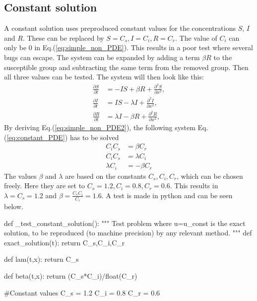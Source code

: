 \documentclass[%
twoside,                 %
final,                   %
chapterprefix=true,      %
open=right               %
10pt]{book}
\begin{document}
\subsection{Constant solution}
A constant solution uses preproduced constant values for the concentrations $S$, $I$ and $R$. These can be replaced by $S = C_s,I=C_i,R=C_r$. The value of $C_i$ can only be 0 in Eq.(\ref{eq:simple_non_PDE}). This results in a poor test where several bugs can escape. The system can be expanded by adding a term $\beta R$ to the susceptible group and subtracting the same term from the removed group. Then all three values can be tested. The system will then look like this: 
\begin{equation} \label{eq:simple_non_PDE2}
	\begin{aligned}
	\frac{\partial S}{\partial t} &= -IS + \beta R + \frac{\partial^2 S}{\partial x^2},\\
	\frac{\partial I}{\partial t} &= IS- \lambda I + \frac{\partial^2 I}{\partial x^2},\\
	\frac{\partial R}{\partial t} &= \lambda I - \beta R + \frac{\partial^2 R}{\partial x^2},
	\end{aligned}
\end{equation}
By deriving Eq.(\ref{eq:simple_non_PDE2}), the following system Eq.(\ref{eq:constant_PDE}) has to be solved
\begin{equation} \label{eq:constant_PDE}
	\begin{aligned}
	C_iC_s &= \beta C_r \\
	C_iC_s &= \lambda C_i \\
	\lambda C_i &= -\beta C_r 
	\end{aligned}
\end{equation}
The values $\beta$ and $\lambda$ are based on the constants $C_s,C_i,C_r$, which can be chosen freely. Here they are set to $C_s = 1.2,C_i=0.8,C_r=0.6$. This results in $\lambda= C_s = 1.2$ and $\beta= \frac{C_s C_i}{C_r}=1.6$. A test is made in python and can be seen below.

\bpycod
def _test_constant_solution():
    """
    Test problem where u=u_const is the exact solution, to be
    reproduced (to machine precision) by any relevant method.
    """
    def exact_solution(t):
        return C_s,C_i,C_r
    
    def lam(t,x):
        return C_s

    def beta(t,x):
        return (C_s*C_i)/float(C_r)

    #Constant values
    C_s = 1.2
    C_i = 0.8
    C_r = 0.6
    
\end{document}
